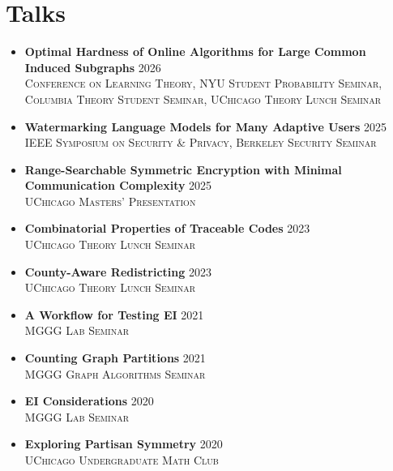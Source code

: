 \section*{Talks}

\begin{itemize}
    \item \textbf{Optimal Hardness of Online Algorithms for Large Common Induced Subgraphs} \hfill 2026 \\\textsc{Conference on Learning Theory, NYU Student Probability Seminar, Columbia Theory Student Seminar, UChicago Theory Lunch Seminar}
    \item \textbf{Watermarking Language Models for Many Adaptive Users} \hfill 2025 \\ \textsc{IEEE Symposium on Security \& Privacy, Berkeley Security Seminar}
    \item \textbf{Range-Searchable Symmetric Encryption with Minimal Communication Complexity} \hfill 2025 \\\textsc{UChicago Masters' Presentation}
    \item \textbf{Combinatorial Properties of Traceable Codes} \hfill 2023 \\\textsc{UChicago Theory Lunch Seminar}
    \item \textbf{County-Aware Redistricting}  \hfill 2023 \\\textsc{UChicago Theory Lunch Seminar}
    \item \textbf{A Workflow for Testing EI} \hfill 2021 \\\textsc{MGGG Lab Seminar} 
    \item \textbf{Counting Graph Partitions} \hfill 2021 \\\textsc{MGGG Graph Algorithms Seminar} 
    \item \textbf{EI Considerations} \hfill 2020 \\\textsc{MGGG Lab Seminar} 
    \item \textbf{Exploring Partisan Symmetry} \hfill 2020 \\\textsc{UChicago Undergraduate Math Club} 
\end{itemize}




